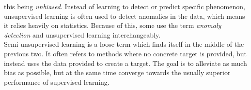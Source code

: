 this being \emph{unbiased}. Instead of learning to detect or predict specific phenomenon,
unsupervised learning is often used to detect anomalies in the data, which means it relies
heavily on statistics. Because of this, some use the term \emph{anomaly detection} and 
unsupervised learning interchangeably.
\\
Semi-unsupervised learning is a loose term
which finds itself in the middle of the previous two. It often refers to methods where 
no concrete target is provided, but instead uses the data provided to create a target. The goal 
is to alleviate as much bias as possible, but at the same time converge towards the usually 
superior performance of supervised learning.  